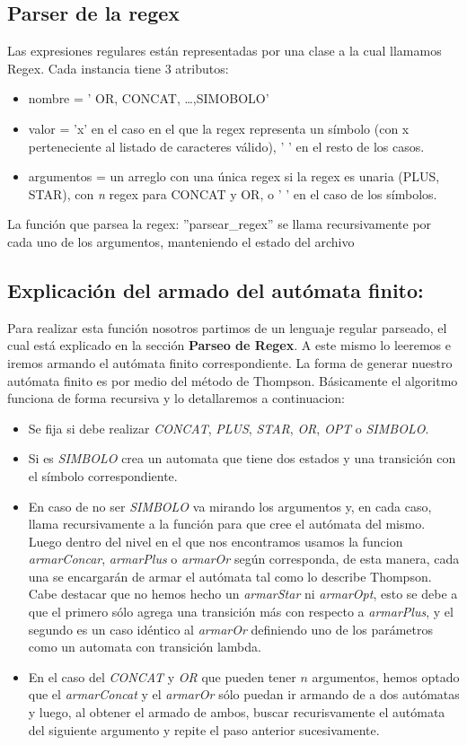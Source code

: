 \subsection{Parser de la regex}
Las expresiones regulares están representadas por una clase a la cual llamamos Regex.
Cada instancia tiene 3 atributos: 
\begin{itemize}
	\item nombre = ' OR, CONCAT, \ldots ,SIMOBOLO'
	\item valor = 'x' en el caso en el que la regex representa un símbolo (con x perteneciente al listado de caracteres válido), ' ' en el resto de los casos.
	\item argumentos = un arreglo con una única regex si la regex es unaria (PLUS, STAR), con \emph{n} regex para CONCAT y OR, o ' ' en el caso de los símbolos.
\end{itemize}
La función que parsea la regex: ''parsear\_regex'' se llama recursivamente por cada uno de los argumentos, manteniendo el estado del archivo


\subsection{Explicación del armado del autómata finito:}
Para realizar esta función nosotros partimos de un lenguaje regular parseado, el cual está explicado en la sección \textbf{Parseo de Regex}. A este mismo lo leeremos e iremos armando el autómata finito correspondiente.
La forma de generar nuestro autómata finito es por medio del método de Thompson. Básicamente el algoritmo funciona de forma recursiva y lo detallaremos a continuacion:
\begin{itemize}
\item Se fija si debe realizar \textit{CONCAT}, \textit{PLUS}, \textit{STAR}, \textit{OR}, \textit{OPT} o \textit{SIMBOLO}.
\item Si es \textit{SIMBOLO} crea un automata que tiene dos estados y una transición con el símbolo correspondiente.
\item En caso de no ser \textit{SIMBOLO} va mirando los argumentos y, en cada caso, llama recursivamente a la función para que cree el autómata del mismo. Luego dentro del nivel en el que nos encontramos usamos la funcion \textit{armarConcar}, \textit{armarPlus} o \textit{armarOr} según corresponda, de esta manera, cada una se encargarán de armar el autómata tal como lo describe Thompson. Cabe destacar que no hemos hecho un \textit{armarStar} ni \textit{armarOpt}, esto se debe a que el primero sólo agrega una transición más con respecto a \textit{armarPlus}, y el segundo es un caso idéntico al \textit{armarOr} definiendo uno de los parámetros como un automata con transición lambda.
\item En el caso del \textit{CONCAT} y \textit{OR} que pueden tener $n$ argumentos, hemos optado que el \textit{armarConcat} y el \textit{armarOr} sólo puedan ir armando de a dos autómatas y luego, al obtener el armado de ambos, buscar recurisvamente el autómata del siguiente argumento y repite el paso anterior sucesivamente.
\end{itemize}


